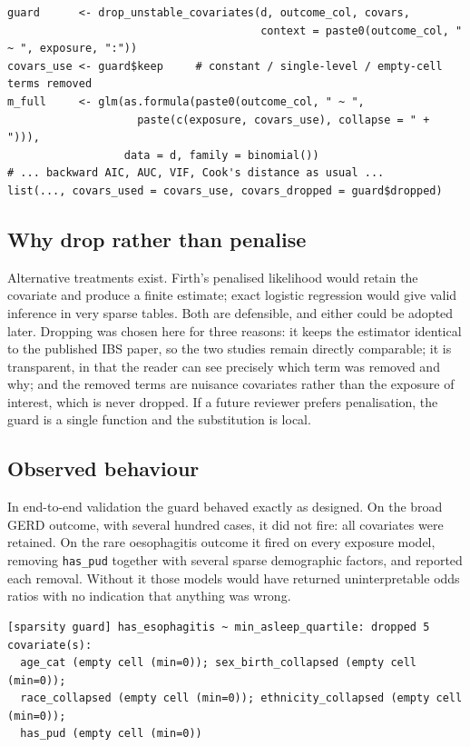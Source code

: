 \documentclass[11pt]{article}
\newcommand{\code}[1]{\texttt{\small #1}}
\begin{document}
\begin{lstlisting}[caption={The guard, applied inside the per-exposure fitting function.}]
guard      <- drop_unstable_covariates(d, outcome_col, covars,
                                       context = paste0(outcome_col, " ~ ", exposure, ":"))
covars_use <- guard$keep     # constant / single-level / empty-cell terms removed
m_full     <- glm(as.formula(paste0(outcome_col, " ~ ",
                    paste(c(exposure, covars_use), collapse = " + "))),
                  data = d, family = binomial())
# ... backward AIC, AUC, VIF, Cook's distance as usual ...
list(..., covars_used = covars_use, covars_dropped = guard$dropped)
\end{lstlisting}

\subsection{Why drop rather than penalise}
Alternative treatments exist. Firth's penalised likelihood would retain the covariate and produce a
finite estimate; exact logistic regression would give valid inference in very sparse tables. Both are
defensible, and either could be adopted later. Dropping was chosen here for three reasons: it keeps
the estimator identical to the published IBS paper, so the two studies remain directly comparable; it
is transparent, in that the reader can see precisely which term was removed and why; and the removed
terms are nuisance covariates rather than the exposure of interest, which is never dropped. If a
future reviewer prefers penalisation, the guard is a single function and the substitution is local.

\subsection{Observed behaviour}
In end-to-end validation the guard behaved exactly as designed. On the broad GERD outcome, with
several hundred cases, it did not fire: all covariates were retained. On the rare oesophagitis
outcome it fired on every exposure model, removing \code{has_pud} together with several sparse
demographic factors, and reported each removal. Without it those models would have returned
uninterpretable odds ratios with no indication that anything was wrong.

\begin{lstlisting}[caption={Console output from the guard during validation (abridged).}]
[sparsity guard] has_esophagitis ~ min_asleep_quartile: dropped 5 covariate(s):
  age_cat (empty cell (min=0)); sex_birth_collapsed (empty cell (min=0));
  race_collapsed (empty cell (min=0)); ethnicity_collapsed (empty cell (min=0));
  has_pud (empty cell (min=0))
\end{lstlisting}
\end{document}
